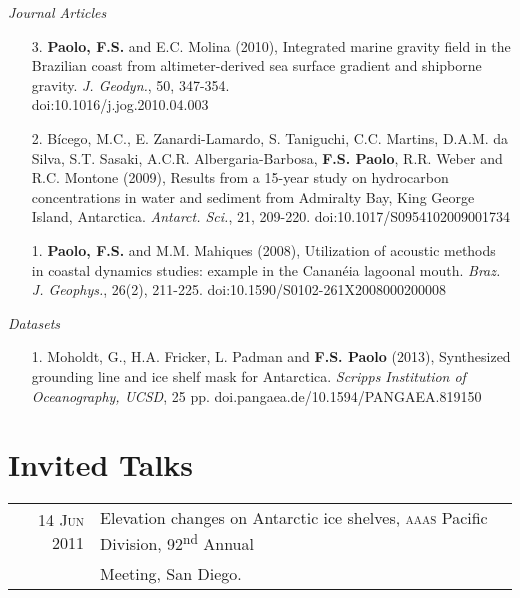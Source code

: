\documentclass[a4paper,11pt]{article}
\begin{document}
\emph{Journal Articles}

\begin{enumerate}
  \item [3.] {\bf Paolo, F.S.} and E.C. Molina (2010), Integrated marine 
        gravity field in the Brazilian coast from altimeter-derived sea 
        surface gradient and shipborne gravity. {\it J. Geodyn.}, 50, 347-354.\\
        doi:10.1016/j.jog.2010.04.003
  \item [2.] B\'icego, M.C., E. Zanardi-Lamardo, S. Taniguchi, C.C. Martins, 
        D.A.M. da Silva, S.T. Sasaki, A.C.R. Albergaria-Barbosa, {\bf F.S. 
        Paolo}, R.R. Weber and R.C. Montone (2009), Results from a 15-year 
        study on hydrocarbon concentrations in water and sediment from 
        Admiralty Bay, King George Island, Antarctica. {\it Antarct. Sci.}, 
        21, 209-220. doi:10.1017/S0954102009001734
  \item [1.] {\bf Paolo, F.S.} and M.M. Mahiques (2008), Utilization of 
        acoustic methods in coastal dynamics studies: example in the 
        Canan\'eia lagoonal mouth. {\it Braz. J. Geophys.}, 26(2), 211-225. 
        doi:10.1590/S0102-261X2008000200008
\end{enumerate}

\emph{Datasets}

\begin{enumerate}
  \item [1.] Moholdt, G., H.A. Fricker, L. Padman and {\bf F.S. Paolo} (2013), 
        Synthesized grounding line and ice shelf mask for Antarctica.
        {\it Scripps Institution of Oceanography, UCSD}, 25 pp.
        doi.pangaea.de/10.1594/PANGAEA.819150
\end{enumerate}


\section{Invited Talks}

\begin{tabular}{rl}
14 \textsc{Jun} 2011 & Elevation changes on Antarctic ice shelves, \textsc{aaas} Pacific Division, 92\textsuperscript{nd} Annual\\ 
& Meeting, San Diego.
\end{tabular}
\end{document}
